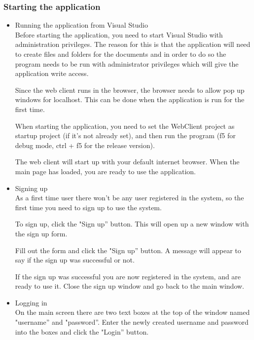 \documentclass[11pt]{article}
\begin{document}
\subsubsection{Starting the application}
\label{sec-3-4-1}
\begin{itemize}

\item Running the application from Visual Studio\\
\label{sec-3-4-1-1}%
Before starting the application, you need to start Visual Studio with administration privileges.
The reason for this is that the application will need to create files and folders for the documents and in order to do so the program needs to be run with administrator privileges which will give the application write access.

Since the web client runs in the browser, the browser needs to allow pop up windows for localhost.
This can be done when the application is run for the first time.

When starting the application, you need to set the WebClient project as startup project (if it's not already set), and then run the program (f5 for debug mode, ctrl + f5 for the release version).

The web client will start up with your default internet browser. 
When the main page has loaded, you are ready to use the application.

\item Signing up\\
\label{sec-3-4-1-2}%
As a first time user there won't be any user registered in the system, so the first time you need to sign up to use the system.

To sign up, click the "Sign up'' button. This will open up a new window with the sign up form.

Fill out the form and click the "Sign up'' button. A message will appear to say if the sign up was successful or not.

If the sign up was successful you are now registered in the system, and are ready to use it. 
Close the sign up window and go back to the main window.

\item Logging in\\
\label{sec-3-4-1-3}%
On the main screen there are two text boxes at the top of the window named "username'' and "password''.
Enter the newly created username and password into the boxes and click the "Login'' button.
\end{itemize} %
\end{document}
